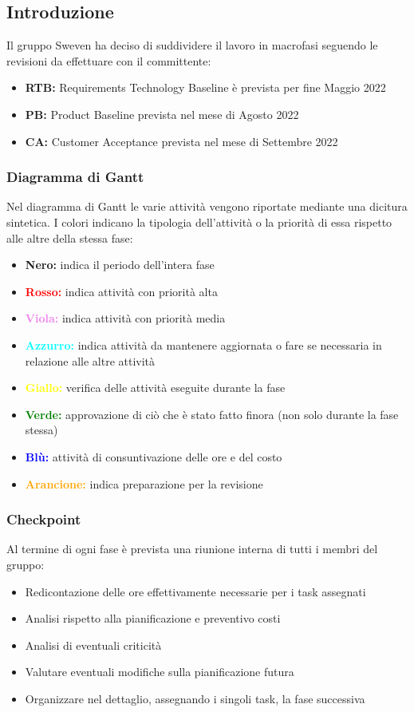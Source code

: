 \subsection{Introduzione}
Il gruppo Sweven ha deciso di suddividere il lavoro in macrofasi seguendo le revisioni da effettuare con il committente:
\begin{itemize}
    \item \textbf{RTB:} Requirements Technology Baseline è prevista per fine Maggio 2022
    \item \textbf{PB:} Product Baseline prevista nel mese di Agosto 2022
    \item \textbf{CA:} Customer Acceptance prevista nel mese di Settembre 2022
\end{itemize}

\subsubsection{Diagramma di Gantt}
Nel diagramma di Gantt le varie attività vengono riportate mediante una dicitura sintetica. 
I colori indicano la tipologia dell'attività o la priorità di essa rispetto alle altre della stessa fase:
\begin{itemize}
    \item \textbf{Nero:} indica il periodo dell'intera fase
    \item \textbf{\textcolor{red}{Rosso:}} indica attività con priorità alta
    \item \textbf{\textcolor{violet}{Viola:}} indica attività con priorità media
    \item \textbf{\textcolor{cyan}{Azzurro:}} indica attività da mantenere aggiornata o fare se necessaria in relazione alle altre attività
    \item \textbf{\textcolor{yellow}{Giallo:}} verifica delle attività eseguite durante la fase
    \item \textbf{\textcolor{green}{Verde:}} approvazione di ciò che è stato fatto finora (non solo durante la fase stessa)
    \item \textbf{\textcolor{blue}{Blù:}} attività di consuntivazione delle ore e del costo
    \item \textbf{\textcolor{orange}{Arancione:}} indica preparazione per la revisione 
\end{itemize}

\subsubsection{Checkpoint}
Al termine di ogni fase è prevista una riunione interna di tutti i membri del gruppo:
    \begin{itemize}
        \item Redicontazione delle ore effettivamente necessarie per i task assegnati
        \item Analisi rispetto alla pianificazione e preventivo costi
        \item Analisi di eventuali criticità
        \item Valutare eventuali modifiche sulla pianificazione futura
        \item Organizzare nel dettaglio, assegnando i singoli task, la fase successiva 
    \end{itemize}
